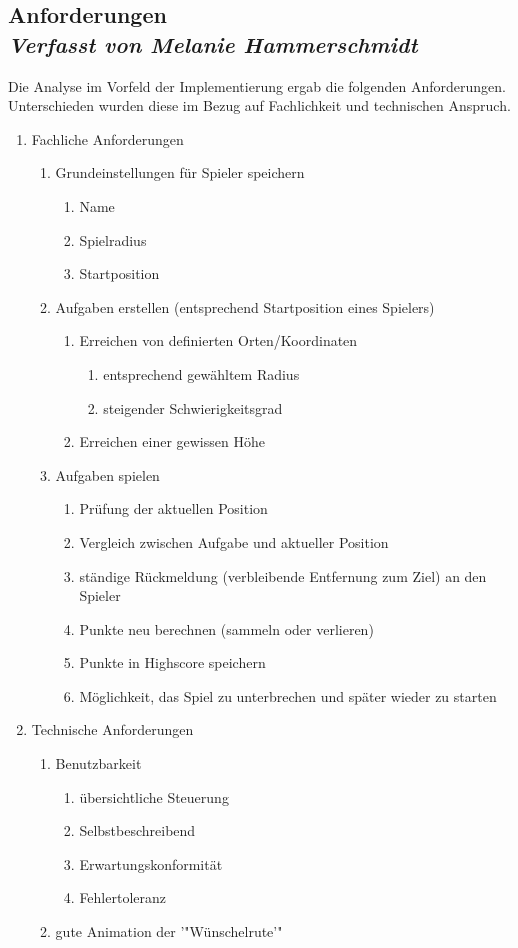 \subsection[Anforderungen]{Anforderungen
 \\ \textnormal{\small{\textit {Verfasst von Melanie Hammerschmidt}}}}

Die Analyse im Vorfeld der Implementierung ergab die folgenden Anforderungen. Unterschieden wurden diese im Bezug auf Fachlichkeit und technischen Anspruch.
\begin{enumerate}
\item Fachliche Anforderungen
	\begin{enumerate}
		\item Grundeinstellungen für Spieler speichern
		\begin{enumerate}
			\item Name
			\item Spielradius		
			\item Startposition
		\end{enumerate}
		\item Aufgaben erstellen (entsprechend Startposition eines Spielers)
		\begin{enumerate}
			\item Erreichen von definierten Orten/Koordinaten
			\begin{enumerate}
				\item entsprechend gewähltem Radius
				\item steigender Schwierigkeitsgrad
			\end{enumerate}
			\item Erreichen einer gewissen Höhe
		\end{enumerate}
		\item Aufgaben spielen
		\begin{enumerate}
			\item Prüfung der aktuellen Position 
			\item Vergleich zwischen Aufgabe und aktueller Position
			\item ständige Rückmeldung (verbleibende Entfernung zum Ziel) an den Spieler
			\item Punkte neu berechnen (sammeln oder verlieren)
			\item Punkte in Highscore speichern
			\item Möglichkeit, das Spiel zu unterbrechen und später wieder zu starten
		\end{enumerate}
	\end{enumerate}
	\item Technische Anforderungen
	\begin{enumerate}
		\item Benutzbarkeit
		\begin{enumerate}
			\item übersichtliche Steuerung
			\item Selbstbeschreibend
			\item Erwartungskonformität
			\item Fehlertoleranz
		\end{enumerate}
		\item gute Animation der '"Wünschelrute'"
	\end{enumerate}
\end{enumerate}
